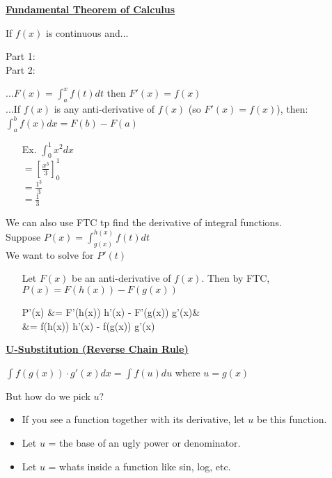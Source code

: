 \documentclass{letter}
\begin{document}
	\underline{\textbf{Fundamental Theorem of Calculus}}
	
	If $f(x)$ is continuous and...$\;\;\;\;$
	\begin{minipage}[t]{0.2\textwidth}
		Part 1:\\
		Part 2:
	\end{minipage}
	\begin{minipage}[t]{0.8\textwidth}
		...$F(x) = \int_a^x f(t) dt$ then $F'(x) = f(x)$\\
		...If $f(x)$ is any anti-derivative of $f(x)$ (so $F'(x) = f(x)$), then:\\
		$\displaystyle \int_a^b f(x) dx = F(b) - F(a)$
	\end{minipage}
	
	\begin{itemize}
		\item[Ex. ] $\displaystyle \int_0^1 x^2 dx$\\
		$\displaystyle =\left[ \frac{x^3}{3}\right]_0^1$\\
		$\displaystyle =\frac{1^3}{3}$\\
		$\displaystyle = \frac{1}{3}$
	\end{itemize}
	
	We can also use FTC tp find the derivative of integral functions.\\
	Suppose $P(x) = \int_{g(x)}^{h(x)}f(t) dt$\\
	We want to solve for $P'(t)$
	\begin{itemize}
		\item[\;\;] Let $F(x)$ be an anti-derivative of $f(x)$. Then by FTC, $P(x) = F(h(x)) - F(g(x))$
		\begin{flalign*}
			P'(x) &= F'(h(x)) \cdot h'(x) - F'(g(x)) \cdot g'(x)&\\
			&= f(h(x)) \cdot h'(x) - f(g(x)) \cdot g'(x)
		\end{flalign*}
	\end{itemize}
	
	\clearpage
	
	\underline{\textbf{U-Substitution (Reverse Chain Rule)}}
	
	$\int f(g(x)) \cdot g'(x) dx = \int f(u) du$ where $u = g(x)$
	
	But how do we pick $u$?
	\begin{itemize}
		\item If you see a function together with its derivative, let $u$ be this function.
		\item Let $u$ = the base of an ugly power or denominator.
		\item Let $u$ = whats inside a function like sin, log, etc.
	\end{itemize}
	
\end{document}
